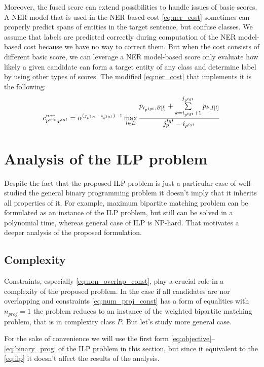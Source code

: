 Moreover, the fused score can extend possibilities to handle issues of basic scores.
A NER model that is used in the NER-based cost \eqref{eq:ner_cost} sometimes can properly
predict spans of entities in the target sentence, but confuse classes.
We assume that labels are predicted correctly during computation of the NER model-based cost because
we have no way to correct them. But when the cost consists of different basic score, we can leverage a
NER model-based score only evaluate how likely a given candidate can form a target entity of any class and
determine label by using other types of scores. The modified \eqref{eq:ner_cost} that implements it
is the following:
\begin{equation} \label{eq:ner_cost_wo_classes}
    c_{p^{src}, p^{tgt}}^{ner} = \alpha^{(j_{p^{tgt}} - i_{p^{tgt}}) - 1}
    \max\limits_{l \in L}
    \frac{
        p_{i_{p^{tgt}}, B[l]} +
        \sum\limits_{k = i_{p^{tgt}} + 1}^{j_{p^{tgt}}} p_{k, I[l]}
    }
    {j_p^{tgt} - i_{p^{tgt}}}
\end{equation}

\section{Analysis of the ILP problem}
Despite the fact that the proposed ILP problem is just a particular case
of well-studied the general binary programming problem it doesn't imply that
it inherits all properties of it. For example, maximum bipartite matching problem
can be formulated as an instance of the ILP problem, but still can be solved in a
polynomial time, whereas general case of ILP is NP-hard. That motivates a deeper analysis
of the proposed formulation.

\subsection{Complexity}
Constraints, especially \eqref{eq:non_overlap_const}, play a crucial role in a complexity
of the proposed problem. In the case if all candidates are nor overlapping and constraints
\eqref{eq:num_proj_const} has a form of equalities with \( n_{proj} = 1 \) the problem reduces to
an instance of the weighted bipartite matching problem, that is in complexity class \( P \). But let's study
more general case.

For the sake of convenience we will use the first form \eqref{eq:objective}--\eqref{eq:binary_prog}
of the ILP problem in this section, but since it equivalent to the \eqref{eq:ilp} it doesn't affect
the results of the analysis.

